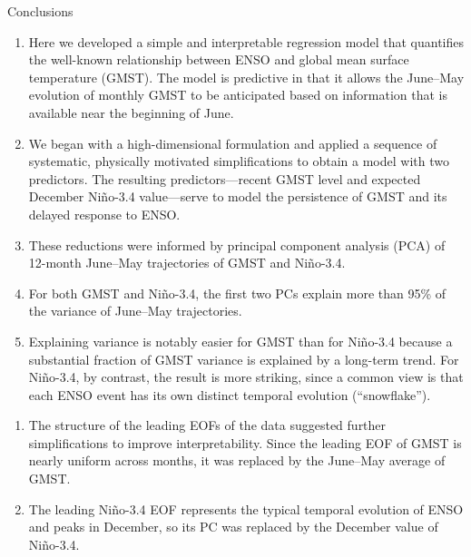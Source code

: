 \documentclass[aspectratio=169,xcolor=dvipsnames]{beamer}
\begin{document}
\begin{frame}[allowframebreaks]{Conclusions}
  
  \begin{enumerate}\fontsize{6pt}{8pt}\selectfont

  \item Here we developed a simple and interpretable regression model
    that quantifies the well-known relationship between ENSO and
    global mean surface temperature (GMST). The model is predictive in
    that it allows the June--May evolution of monthly GMST to be
    anticipated based on information that is available near the
    beginning of June.

  \item We began with a high-dimensional formulation and applied a
    sequence of systematic, physically motivated simplifications to
    obtain a model with two predictors. The resulting
    predictors---recent GMST level and expected December Ni\~no-3.4
    value---serve to model the persistence of GMST and its delayed
    response to ENSO.

  \item These reductions were informed by principal component analysis
    (PCA) of 12-month June--May trajectories of GMST and Ni\~no-3.4.

  \item For both GMST and Ni\~no-3.4, the first two PCs explain more
    than 95\% of the variance of June--May trajectories.

  \item Explaining variance is notably easier for GMST than for
    Ni\~no-3.4 because a substantial fraction of GMST variance is
    explained by a long-term trend.  For Ni\~no-3.4, by contrast, the
    result is more striking, since a common view is that each ENSO
    event has its own distinct temporal evolution (``snowflake'').
  
  \end{enumerate}

  \begin{enumerate}\fontsize{6pt}{8pt}\selectfont
  \item The structure of the leading EOFs of the data suggested
    further simplifications to improve interpretability. Since the
    leading EOF of GMST is nearly uniform across months, it was
    replaced by the June--May average of GMST.

  \item The leading Ni\~no-3.4 EOF represents the typical temporal
    evolution of ENSO and peaks in December, so its PC was replaced by
    the December value of Ni\~no-3.4.
    

\end{enumerate}
\end{frame}
\end{document}
